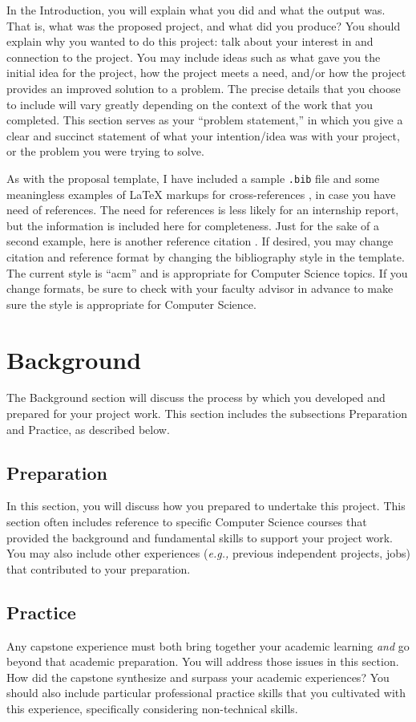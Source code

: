 \documentclass[titlepage]{article}
\begin{document}
In the Introduction, you will explain what you did and what the output was. That is, what was the proposed project, and what did you produce? You should explain why you wanted to do this project: talk about your interest in and connection to the project. You may include ideas such as what gave you the initial idea for the project, how the project meets a need, and/or how the project provides an improved solution to a problem. The precise details that you choose to include will vary greatly depending on the context of the work that you completed. This section serves as your ``problem statement,'' in which you give a clear and succinct statement of what your intention/idea was with your project, or the problem you were trying to solve.

As with the proposal template, I have included a sample \texttt{.bib} file and some meaningless examples of \LaTeX{ }markups for cross-references \cite{pholdee_hybrid_2017}, in case you have need of references. The need for references is less likely for an internship report, but the information is included here for completeness. Just for the sake of a second example, here is another reference citation \cite{hadka_large-scale_2015}. If desired, you may change citation and reference format by changing the bibliography style in the template. The current style is ``acm'' and is appropriate for Computer Science topics. If you change formats, be sure to check with your faculty advisor in advance to make sure the style is appropriate for Computer Science.

\section{Background}
The Background section will discuss the process by which you developed and prepared for your project work. This section includes the subsections Preparation and Practice, as described below.

\subsection{Preparation}
In this section, you will discuss how you prepared to undertake this project. This section often includes reference to specific Computer Science courses that provided the background and fundamental skills to support your project work. You may also include other experiences (\textit{e.g.,} previous independent projects, jobs) that contributed to your preparation.

\subsection{Practice}
Any capstone experience must both bring together your academic learning \textit{and} go beyond that academic preparation. You will address those issues in this section. How did the capstone synthesize and surpass your academic experiences? You should also include particular professional practice skills that you cultivated with this experience, specifically considering non-technical skills.
\end{document}
